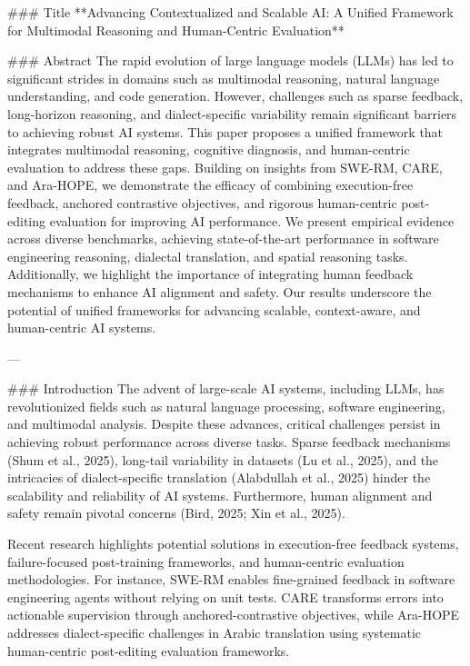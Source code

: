 ### Title  
**Advancing Contextualized and Scalable AI: A Unified Framework for Multimodal Reasoning and Human-Centric Evaluation**

### Abstract  
The rapid evolution of large language models (LLMs) has led to significant strides in domains such as multimodal reasoning, natural language understanding, and code generation. However, challenges such as sparse feedback, long-horizon reasoning, and dialect-specific variability remain significant barriers to achieving robust AI systems. This paper proposes a unified framework that integrates multimodal reasoning, cognitive diagnosis, and human-centric evaluation to address these gaps. Building on insights from SWE-RM, CARE, and Ara-HOPE, we demonstrate the efficacy of combining execution-free feedback, anchored contrastive objectives, and rigorous human-centric post-editing evaluation for improving AI performance. We present empirical evidence across diverse benchmarks, achieving state-of-the-art performance in software engineering reasoning, dialectal translation, and spatial reasoning tasks. Additionally, we highlight the importance of integrating human feedback mechanisms to enhance AI alignment and safety. Our results underscore the potential of unified frameworks for advancing scalable, context-aware, and human-centric AI systems.

---

### Introduction  
The advent of large-scale AI systems, including LLMs, has revolutionized fields such as natural language processing, software engineering, and multimodal analysis. Despite these advances, critical challenges persist in achieving robust performance across diverse tasks. Sparse feedback mechanisms (Shum et al., 2025), long-tail variability in datasets (Lu et al., 2025), and the intricacies of dialect-specific translation (Alabdullah et al., 2025) hinder the scalability and reliability of AI systems. Furthermore, human alignment and safety remain pivotal concerns (Bird, 2025; Xin et al., 2025).

Recent research highlights potential solutions in execution-free feedback systems, failure-focused post-training frameworks, and human-centric evaluation methodologies. For instance, SWE-RM enables fine-grained feedback in software engineering agents without relying on unit tests. CARE transforms errors into actionable supervision through anchored-contrastive objectives, while Ara-HOPE addresses dialect-specific challenges in Arabic translation using systematic human-centric post-editing evaluation frameworks.

